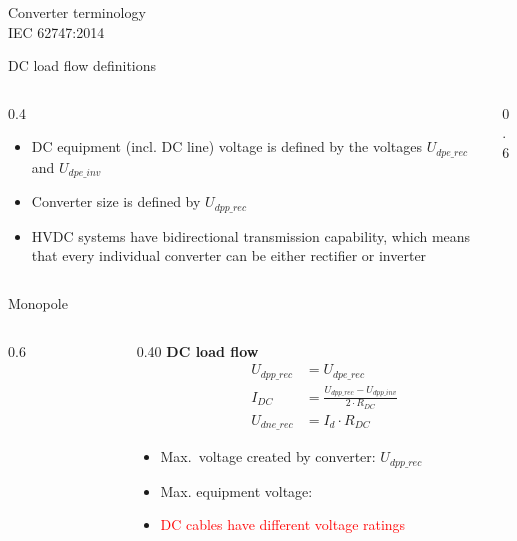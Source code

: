 \begin{frame}{Converter terminology}
  \centering
  \\[0.3em]
  {\color{atGray}\footnotesize IEC 62747:2014}
\end{frame}

\begin{frame}{DC load flow definitions}
  \begin{columns}[c,onlytextwidth]
    \begin{column}{0.4\textwidth}\centering
      \begin{itemize}
        \item DC equipment (incl. DC line) voltage is defined by the voltages $U_{dpe\_rec}$ and $U_{dpe\_inv}$
        \item Converter size is defined by $U_{dpp\_rec}$
        \item HVDC systems have bidirectional transmission capability, which means that every individual converter can be either rectifier or inverter
      \end{itemize}
    \end{column}
    \begin{column}{0.6\textwidth}\centering
    \end{column}
  \end{columns}
\end{frame}

\begin{frame}{Monopole}
  \begin{columns}[c,onlytextwidth]
    \begin{column}{0.6\textwidth}\centering
    \end{column}
    \begin{column}{0.40\textwidth}
      \textbf{DC load flow}
      \begin{align*}
        U_{dpp\_rec} &= U_{dpe\_rec}\\
        I_{DC} &= \tfrac{U_{dpp\_rec}-U_{dpp\_inv}}{2 \cdot R_{DC}}\\
        U_{dne\_rec} &= I_{d}\cdot R_{DC}
      \end{align*}
      \begin{itemize}
        \item Max.\ voltage created by converter: $U_{dpp\_rec}$
        \item Max. equipment voltage: 
        \item \textcolor{red}{DC cables have different voltage ratings}
      \end{itemize}
    \end{column}
  \end{columns}
\end{frame}

